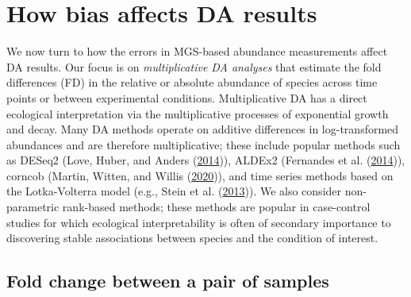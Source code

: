 \documentclass[
]{article}
\begin{document}
\hypertarget{differential-abundance}{%
\section{How bias affects DA results}\label{differential-abundance}}

We now turn to how the errors in MGS-based abundance measurements affect DA results.
Our focus is on \emph{multiplicative DA analyses} that estimate the fold differences (FD) in the relative or absolute abundance of species across time points or between experimental conditions.
Multiplicative DA has a direct ecological interpretation via the multiplicative processes of exponential growth and decay.
Many DA methods operate on additive differences in log-transformed abundances and are therefore multiplicative; these include popular methods such as DESeq2 (Love, Huber, and Anders (\protect\hyperlink{ref-love2014mode}{2014})), ALDEx2 (Fernandes et al. (\protect\hyperlink{ref-fernandes2014unif}{2014})), corncob (Martin, Witten, and Willis (\protect\hyperlink{ref-martin2020mode}{2020})), and time series methods based on the Lotka-Volterra model (e.g., Stein et al. (\protect\hyperlink{ref-stein2013ecol}{2013})).
We also consider non-parametric rank-based methods; these methods are popular in case-control studies for which ecological interpretability is often of secondary importance to discovering stable associations between species and the condition of interest.

\hypertarget{fold-change-between-a-pair-of-samples}{%
\subsection{Fold change between a pair of samples}\label{fold-change-between-a-pair-of-samples}}
\end{document}
